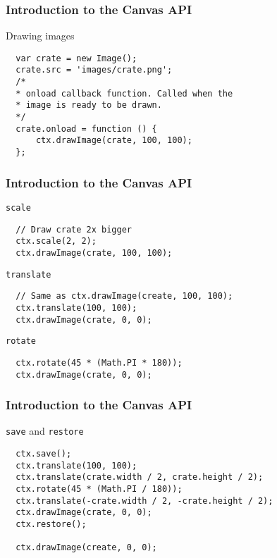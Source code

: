 \begin{frame}[fragile]
  \frametitle{Introduction to the Canvas API}

  \begin{block}{Drawing images}
  {\scriptsize
  \begin{verbatim}
  var crate = new Image();
  crate.src = 'images/crate.png';
  /*
  * onload callback function. Called when the
  * image is ready to be drawn.
  */
  crate.onload = function () {
      ctx.drawImage(crate, 100, 100);
  };
  \end{verbatim}
  }
  \end{block}
\end{frame}

\begin{frame}[fragile]
  \frametitle{Introduction to the Canvas API}

  \begin{block}{\texttt{scale}}
  {\tiny
  \begin{verbatim}
  // Draw crate 2x bigger
  ctx.scale(2, 2);
  ctx.drawImage(crate, 100, 100);
  \end{verbatim}
  }
  \end{block}

  \pause

  \begin{block}{\texttt{translate}}
  {\tiny
  \begin{verbatim}
  // Same as ctx.drawImage(create, 100, 100);
  ctx.translate(100, 100);
  ctx.drawImage(crate, 0, 0);
  \end{verbatim}
  }
  \end{block}

  \pause

  \begin{block}{\texttt{rotate}}
  {\tiny
  \begin{verbatim}
  ctx.rotate(45 * (Math.PI * 180));
  ctx.drawImage(crate, 0, 0);
  \end{verbatim}
  }
  \end{block}
\end{frame}

\begin{frame}[fragile]
  \frametitle{Introduction to the Canvas API}

  \begin{block}{\texttt{save} and \texttt{restore}}
  {\tiny
  \begin{verbatim}
  ctx.save();
  ctx.translate(100, 100);
  ctx.translate(crate.width / 2, crate.height / 2);
  ctx.rotate(45 * (Math.PI / 180));
  ctx.translate(-crate.width / 2, -crate.height / 2);
  ctx.drawImage(crate, 0, 0);
  ctx.restore();

  ctx.drawImage(create, 0, 0);
  \end{verbatim}
  }
  \end{block}

\end{frame}
